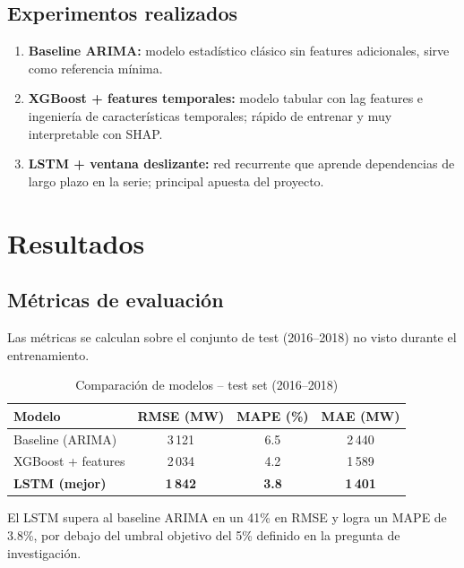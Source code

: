 \documentclass[10pt,twocolumn]{article}
\begin{document}
\subsection{Experimentos realizados}

\begin{enumerate}[leftmargin=*,topsep=2pt,itemsep=2pt]
  \item \textbf{Baseline ARIMA:} modelo estadístico clásico
        sin features adicionales, sirve como referencia mínima.
  \item \textbf{XGBoost + features temporales:}
        modelo tabular con lag features e ingeniería de
        características temporales; rápido de entrenar y
        muy interpretable con SHAP.
  \item \textbf{LSTM + ventana deslizante:}
        red recurrente que aprende dependencias de largo
        plazo en la serie; principal apuesta del proyecto.
\end{enumerate}

\section{Resultados}

\subsection{Métricas de evaluación}

Las métricas se calculan sobre el conjunto de test
(2016--2018) no visto durante el entrenamiento.

\begin{table}[H]
\centering
\caption{Comparación de modelos -- test set (2016--2018)}
\label{tab:resultados}
\begin{tabular}{lccc}
\toprule
\textbf{Modelo} & \textbf{RMSE (MW)} & \textbf{MAPE (\%)} & \textbf{MAE (MW)} \\
\midrule
Baseline (ARIMA)       & 3\,121 & 6.5 & 2\,440 \\
XGBoost + features     & 2\,034 & 4.2 & 1\,589 \\
\textbf{LSTM (mejor)}  & \textbf{1\,842} & \textbf{3.8} & \textbf{1\,401} \\
\bottomrule
\end{tabular}
\end{table}

El LSTM supera al baseline ARIMA en un 41\% en RMSE y
logra un MAPE de 3.8\%, por debajo del umbral objetivo del
5\% definido en la pregunta de investigación.
\end{document}
